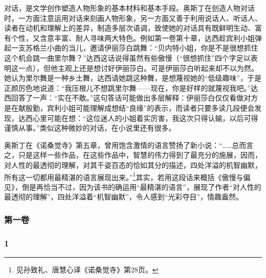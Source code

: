 \par 对话，是文学创作塑造人物形象的基本材料和基本手段。奥斯丁在创造人物对话时，一方面注意运用对话来刻画人物形象，另一方面又善于利用说话人、听话人、读者在动机和理解上的差异，制造多层次语调，致使她的对话具有既鲜明生动、富有个性，又含意丰富、耐人寻味两大特色。例如第一卷第十章，达西趁宾利小姐弹起一支苏格兰小曲的当儿，邀请伊丽莎白跳舞：“贝内特小姐，你是不是很想抓住这个机会跳一曲里尔舞？”达西这话说得虽然有些傲慢（“很想抓住”四个字足以表明这一点），但他主观上还是想讨好伊丽莎白。可是伊丽莎白听起来却不以为然。她认为里尔舞是一种乡土舞，达西请她跳这种舞，是想蔑视她的“低级趣味”，于是正颜厉色地说道：“我压根儿不想跳里尔舞——现在，你是好样的就蔑视我吧。”达西回答了一声：“实在不敢。”这句答话可能做出多层解释：伊丽莎白仅仅看做对方是在献殷勤，宾利小姐可能理解成想结“良缘”的表示，而读者只要多读几段便会发现，达西心里可能在想：“这位迷人的小姐着实厉害，我这次只得认输，以后可得谨慎从事。”类似这种微妙的对话，在小说里还有很多。
\par 奥斯丁在《诺桑觉寺》第五章，曾用饱含激情的语言赞扬了新小说：“……总而言之，只是这样一些作品，在这些作品中，智慧的伟力得到了最充分的施展，因而，对人性的最透彻的理解，对其千姿百态的恰如其分的描述，四处洋溢的机智幽默，所有这一切都用最精湛的语言展现出来。”\footnote{见孙致礼、唐慧心译《诺桑觉寺》第28页。}其实，若用这段话来概括《傲慢与偏见》，倒是再恰当不过，因为该书的确运用“最精湛的语言”，展现了作者“对人性的最透彻的理解”，四处洋溢着“机智幽默”，令人感到“光彩夺目”，情趣盎然。
\par {}


\subsubsection*{第一卷}



\subsubsection*{1}

